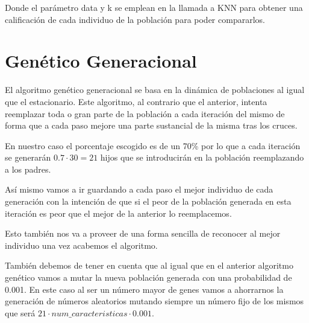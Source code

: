 \documentclass[12pt,a4paper]{article}
\begin{document}
	Donde el parámetro data y k se emplean en la llamada a KNN para obtener una calificación de cada individuo de la población para poder compararlos.

	\newpage

	\section{Genético Generacional}
	\label{sec:GG}

	El algoritmo genético generacional se basa en la dinámica de poblaciones al igual que el estacionario. Este algoritmo, al contrario que el anterior, intenta reemplazar toda o gran parte de la población a cada iteración del mismo de forma que a cada paso mejore una parte sustancial de la misma tras los cruces.

	En nuestro caso el porcentaje escogido es de un 70\% por lo que a cada iteración se generarán $0.7\cdot 30 = 21$ hijos que se introducirán en la población reemplazando a los padres.

	Así mismo vamos a ir guardando a cada paso el mejor individuo de cada generación con la intención de que si el peor de la población generada en esta iteración es peor que el mejor de la anterior lo reemplacemos.

	Esto también nos va a proveer de una forma sencilla de reconocer al mejor individuo una vez acabemos el algoritmo.

	También debemos de tener en cuenta que al igual que en el anterior algoritmo genético vamos a mutar la nueva población generada con una probabilidad de 0.001. En este caso al ser un número mayor de genes vamos a ahorrarnos la generación de números aleatorios mutando siempre un número fijo de los mismos que será $21\cdot num\_caracteristicas\cdot 0.001$.
\end{document}
